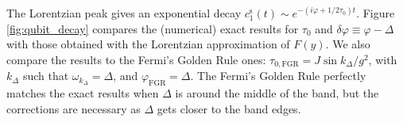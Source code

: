 \documentclass[aps,pra,twocolumn,floatfix,superscriptaddress]{revtex4-1}%
\begin{document}
The Lorentzian peak gives an exponential decay $c_1^\text{s}(t)\sim e^{-(i\varphi+1/2\tau_0)t}$. 
Figure \ref{fig:qubit_decay} compares the (numerical) exact results for $\tau_0$ and $\delta\varphi\equiv\varphi-\Delta$ with those obtained with the Lorentzian approximation of $F(y)$. {\color{blue}We also compare the results to the Fermi's Golden Rule ones: $\tau_{0,\text{FGR}}=J\sin k_\Delta/g^2$, with $k_\Delta$ such that $\omega_{k_\Delta}=\Delta$, and $\varphi_\text{FGR}=\Delta$}. The Fermi's Golden Rule perfectly matches the exact results when $\Delta$ is around the middle of the band, but {\color{blue}the corrections are} necessary as $\Delta$ gets closer to the band edges. %
\end{document}
